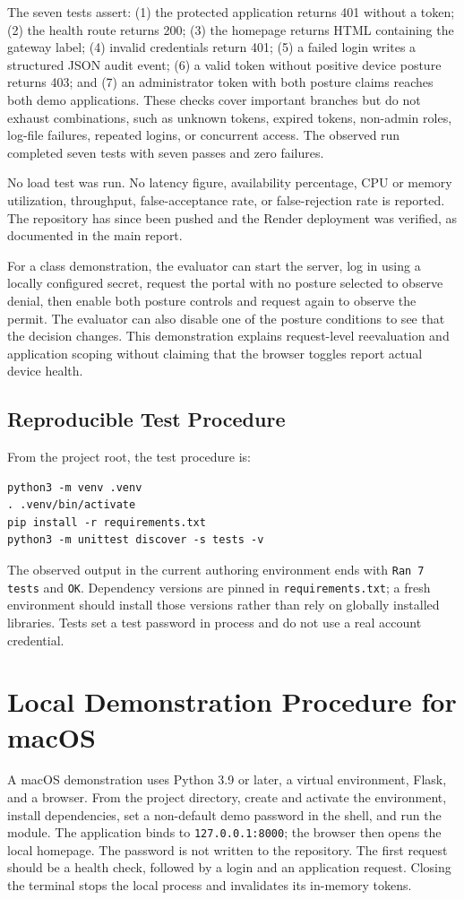 The seven tests assert: (1) the protected application returns 401 without a token; (2) the health route returns 200; (3) the homepage returns HTML containing the gateway label; (4) invalid credentials return 401; (5) a failed login writes a structured JSON audit event; (6) a valid token without positive device posture returns 403; and (7) an administrator token with both posture claims reaches both demo applications. These checks cover important branches but do not exhaust combinations, such as unknown tokens, expired tokens, non-admin roles, log-file failures, repeated logins, or concurrent access. The observed run completed seven tests with seven passes and zero failures.

No load test was run. No latency figure, availability percentage, CPU or memory utilization, throughput, false-acceptance rate, or false-rejection rate is reported. The repository has since been pushed and the Render deployment was verified, as documented in the main report.

For a class demonstration, the evaluator can start the server, log in using a locally configured secret, request the portal with no posture selected to observe denial, then enable both posture controls and request again to observe the permit. The evaluator can also disable one of the posture conditions to see that the decision changes. This demonstration explains request-level reevaluation and application scoping without claiming that the browser toggles report actual device health.

\subsection{Reproducible Test Procedure}
From the project root, the test procedure is:
\begin{lstlisting}[basicstyle=\ttfamily\footnotesize]
python3 -m venv .venv
. .venv/bin/activate
pip install -r requirements.txt
python3 -m unittest discover -s tests -v
\end{lstlisting}
The observed output in the current authoring environment ends with \texttt{Ran 7 tests} and \texttt{OK}. Dependency versions are pinned in \texttt{requirements.txt}; a fresh environment should install those versions rather than rely on globally installed libraries. Tests set a test password in process and do not use a real account credential.

\section{Local Demonstration Procedure for macOS}
A macOS demonstration uses Python 3.9 or later, a virtual environment, Flask, and a browser. From the project directory, create and activate the environment, install dependencies, set a non-default demo password in the shell, and run the module. The application binds to \texttt{127.0.0.1:8000}; the browser then opens the local homepage. The password is not written to the repository. The first request should be a health check, followed by a login and an application request. Closing the terminal stops the local process and invalidates its in-memory tokens.

